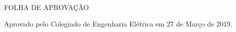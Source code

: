 \begin{folhadeaprovacao}
		\begin{center}
			{\ABNTEXchapterfont \large \textbf {\MakeUppercase{\universidade}\\ \MakeUppercase{\graduacao} }}

			\vspace*{22pt}

			FOLHA DE APROVAÇÃO %

			\vspace*{30pt} %

			{\ABNTEXchapterfont\Large\imprimirautor}

			\vspace*{18pt}

			\begin{center}
				{\ABNTEXchapterfont\Large\imprimirtitulo}
			\end{center}

			\vspace*{40pt} %

			\imprimirpreambulo
		\end{center}

		\assinatura{\imprimirorientador\\ \universidade}
		\assinatura{\bancaum}
		\assinatura{\bancadois}

		\vspace*{77pt} %
		Aprovado pelo Colegiado de Engenharia Elétrica em 27 de Março de 2019.
\end{folhadeaprovacao}
